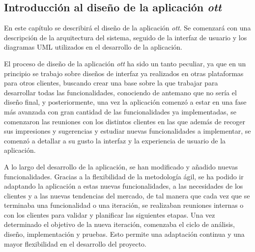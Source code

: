 \subsection{Introducción al diseño de la aplicación \textit{ott}}
\label{subsec:diseno:ott:introduccion}

En este capítulo se describirá el diseño de la aplicación \textit{ott}. Se comenzará con una 
descripción de la arquitectura del sistema, seguido de la interfaz de usuario y los diagramas UML 
utilizados en el desarrollo de la aplicación.

El proceso de diseño de la aplicación \textit{ott} ha sido un tanto peculiar, ya que en un principio
se trabajo sobre diseños de interfaz ya realizados en otras plataformas para otros clientes, buscando crear
una base sobre la que trabajar para desarrollar todas las funcionalidades, conociendo de antemano
que no sería el diseño final, y posteriormente, una vez la aplicación comenzó a estar en una fase más avanzada 
con gran cantidad de las funcionalidades ya implementadas, se comenzaron las reuniones con los distintos 
clientes en las que además de recoger sus impresiones y sugerencias y estudiar nuevas funcionalidades
a implementar, se comenzó a detallar a su gusto la interfaz y la experiencia de usuario de la aplicación.

A lo largo del desarrollo de la aplicación, se han modificado y añadido nuevas funcionalidades. 
Gracias a la flexibilidad de la metodología ágil, se ha podido ir adaptando la aplicación a estas
nuevas funcionalidades, a las necesidades de los clientes y a las nuevas tendencias del mercado, de tal 
manera que cada vez que se terminaba una funcionalidad o una iteración, se realizaban reuniones internas o 
con los clientes para validar y planificar las siguientes etapas. Una vez determinado el objetivo de la 
nueva iteración, comenzaba el ciclo de análisis, diseño, implementación y pruebas. Esto permite una
adaptación continua y una mayor flexibilidad en el desarrollo del proyecto. 


